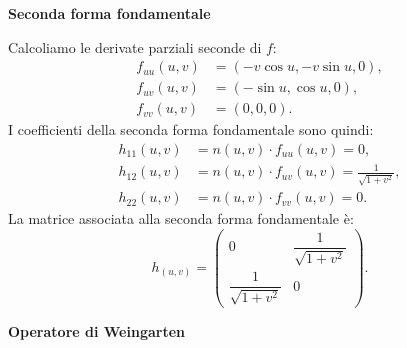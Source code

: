 \begin{esempio}[Elicoide]
\begin{center}
        \end{center}

        \noindent\textbf{Seconda forma fondamentale}

        Calcoliamo le derivate parziali seconde di $f$:
        \begin{align*}
        f_{uu}(u,v) &= (-v \cos u, -v \sin u, 0), \\
        f_{uv}(u,v) &= (-\sin u, \cos u, 0), \\
        f_{vv}(u,v) &= (0, 0, 0).
        \end{align*}
        I coefficienti della seconda forma fondamentale sono quindi:
        \begin{align*}
        h_{11}(u,v) &= n(u,v) \cdot f_{uu}(u,v) = 0, \\
        h_{12}(u,v) &= n(u,v) \cdot f_{uv}(u,v) = \frac{1}{\sqrt{1+v^2}}, \\
        h_{22}(u,v) &= n(u,v) \cdot f_{vv}(u,v) = 0.
        \end{align*}
        La matrice associata alla seconda forma fondamentale è:
        \[
        h_{(u,v)} = 
        \begin{pmatrix}
        0 & \dfrac{1}{\sqrt{1+v^2}} \\[1em]
        \dfrac{1}{\sqrt{1+v^2}} & 0
        \end{pmatrix}.
        \]

        \noindent\textbf{Operatore di Weingarten}


\end{esempio}
